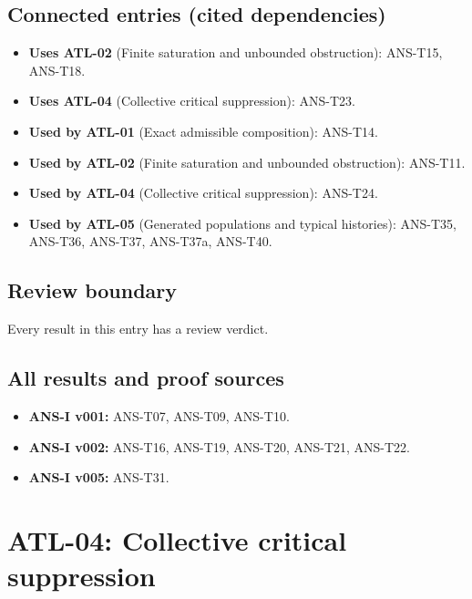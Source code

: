 \documentclass[
  11pt,
]{article}
\providecommand{\tightlist}{%
  \setlength{\itemsep}{0pt}\setlength{\parskip}{0pt}}
\begin{document}
\hypertarget{connected-entries-cited-dependencies-2}{%
\subsection{Connected entries (cited
dependencies)}\label{connected-entries-cited-dependencies-2}}

\begin{itemize}
\tightlist
\item
  \textbf{Uses ATL-02} (Finite saturation and unbounded obstruction):
  ANS-T15, ANS-T18.
\item
  \textbf{Uses ATL-04} (Collective critical suppression): ANS-T23.
\item
  \textbf{Used by ATL-01} (Exact admissible composition): ANS-T14.
\item
  \textbf{Used by ATL-02} (Finite saturation and unbounded obstruction):
  ANS-T11.
\item
  \textbf{Used by ATL-04} (Collective critical suppression): ANS-T24.
\item
  \textbf{Used by ATL-05} (Generated populations and typical histories):
  ANS-T35, ANS-T36, ANS-T37, ANS-T37a, ANS-T40.
\end{itemize}

\hypertarget{review-boundary-2}{%
\subsection{Review boundary}\label{review-boundary-2}}

Every result in this entry has a review verdict.

\hypertarget{all-results-and-proof-sources-2}{%
\subsection{All results and proof
sources}\label{all-results-and-proof-sources-2}}

\begin{itemize}
\tightlist
\item
  \textbf{ANS-I v001:} ANS-T07, ANS-T09, ANS-T10.
\item
  \textbf{ANS-I v002:} ANS-T16, ANS-T19, ANS-T20, ANS-T21, ANS-T22.
\item
  \textbf{ANS-I v005:} ANS-T31.
\end{itemize}

\hypertarget{atl-04-collective-critical-suppression}{%
\section{ATL-04: Collective critical
suppression}\label{atl-04-collective-critical-suppression}}
\end{document}
